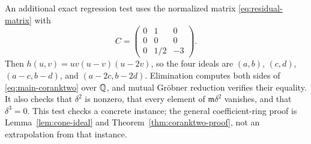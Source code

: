 An additional exact regression test uses the normalized matrix
\eqref{eq:residual-matrix} with
\[
 C=\begin{pmatrix}0&1&0\\0&0&0\\0&1/2&-3\end{pmatrix}.
\]
Then $h(u,v)=uv(u-v)(u-2v)$, so the four ideals are
$(a,b)$, $(c,d)$, $(a-c,b-d)$, and $(a-2c,b-2d)$.
Elimination computes both sides of \eqref{eq:main-coranktwo} over
$\mathbb Q$, and mutual Gr\"obner reduction verifies their equality. It also
checks that $\delta^2$ is nonzero, that every element of
$\mathfrak m\delta^2$ vanishes, and that $\delta^3=0$.
This test checks a concrete instance; the general coefficient-ring
proof is Lemma~\ref{lem:cone-ideal} and
Theorem~\ref{thm:coranktwo-proof}, not an extrapolation from that instance.
